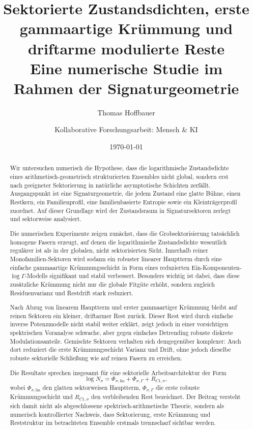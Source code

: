 \documentclass[11pt,a4paper]{article}
\title{Sektorierte Zustandsdichten, erste gammaartige Krümmung und driftarme modulierte Reste\\[0.4em]\large Eine numerische Studie im Rahmen der Signaturgeometrie}
\author{Thomas Hoffbauer \and Kollaborative Forschungsarbeit: Mensch \& KI}
\date{\today}
\theoremstyle{definition}
\theoremstyle{remark}
\begin{document}
\maketitle

\begin{abstract}
Wir untersuchen numerisch die Hypothese, dass die logarithmische Zustandsdichte eines arithmetisch-geometrisch strukturierten Ensembles nicht global, sondern erst nach geeigneter Sektorierung in natürliche asymptotische Schichten zerfällt. Ausgangspunkt ist eine Signaturgeometrie, die jedem Zustand eine glatte Bühne, einen Restkern, ein Familienprofil, eine familienbasierte Entropie sowie ein Kleinträgerprofil zuordnet. Auf dieser Grundlage wird der Zustandsraum in Signatursektoren zerlegt und sektorweise analysiert.

Die numerischen Experimente zeigen zunächst, dass die Grobsektorisierung tatsächlich homogene Fasern erzeugt, auf denen die logarithmische Zustandsdichte wesentlich regulärer ist als in der globalen, nicht sektorisierten Sicht. Innerhalb reiner Monofamilien-Sektoren wird sodann ein robuster linearer Hauptterm durch eine einfache gammaartige Krümmungsschicht in Form eines reduzierten Ein-Komponenten-\(\log\Gamma\)-Modells signifikant und stabil verbessert. Besonders wichtig ist dabei, dass diese zusätzliche Krümmung nicht nur die globale Fitgüte erhöht, sondern zugleich Residuenvarianz und Restdrift stark reduziert.

Nach Abzug von linearem Hauptterm und erster gammaartiger Krümmung bleibt auf reinen Sektoren ein kleiner, driftarmer Rest zurück. Dieser Rest wird durch einfache inverse Potenzmodelle nicht stabil weiter erklärt, zeigt jedoch in einer vorsichtigen spektrischen Voranalyse schwache, aber gegen einfaches Detrending robuste diskrete Modulationsanteile. Gemischte Sektoren verhalten sich demgegenüber komplexer: Auch dort reduziert die erste Krümmungsschicht Varianz und Drift, ohne jedoch dieselbe robuste sektorielle Schließung wie auf reinen Fasern zu erreichen.

Die Resultate sprechen insgesamt für eine sektorielle Arbeitsarchitektur der Form
\[
\log N_\sigma
=
\Phi_{\sigma,\mathrm{lin}}
+
\Phi_{\sigma,\Gamma}
+
R_{C1,\sigma},
\]
wobei \(\Phi_{\sigma,\mathrm{lin}}\) den glatten sektorweisen Hauptterm, \(\Phi_{\sigma,\Gamma}\) die erste robuste Krümmungsschicht und \(R_{C1,\sigma}\) den verbleibenden Rest bezeichnet. Der Beitrag versteht sich damit nicht als abgeschlossene spektrisch-arithmetische Theorie, sondern als numerisch kontrollierter Nachweis, dass Sektorierung, erste Krümmung und Reststruktur im betrachteten Ensemble erstmals trennscharf sichtbar werden.
\end{abstract}
\end{document}
